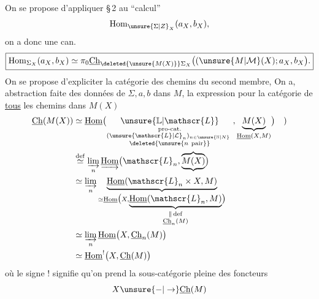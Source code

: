 On se propose d'appliquer    \S\,2
au ``calcul'' 
\[
\operatorname{Hom}_{\unsure{\Sigma|Z}_X}(a_X,b_X),
\]
on a donc une  can.
\[
\boxed{\operatorname{Hom}_{\Sigma_X}(a_X,b_X)\simeq\pi_0\underline{\mathrm{Ch}}_{\deleted{\unsure{M(X)}}\Sigma_X}\bigl((\unsure{M|\mathcal{M}}(X);a_X,b_X\bigr).}
\]
On se propose d'expliciter la catégorie des
chemins du second membre, On a, abstraction
faite des données de $\Sigma,a,b$ dans $M$, la
expression pour la catégorie de \uline{tous} les
chemins dans $M(X)$
\[
\begin{aligned}
\underline{\mathrm{Ch}}(M(X))
&\simeq\underline{\mathrm{Hom}}\bigl(
\underset{\substack{\text{pro-cat.}\\(\unsure{\mathscr{L}|\mathcal{L}}_n)_{n\in\unsure{\mathbb{N}|N}}\ \\ \deleted{\unsure{n\ \mathrm{pair}}}}}{\unsure{\mathbb{L}|\mathscr{L}}},
\underbrace{M(X)}_{\underline{\mathrm{Hom}}(X,M)}\bigr)\quad )\\
&\overset{\mathrm{def}}{\simeq}\varinjlim_n
\underrightarrow{\underline{\mathrm{Hom}}}\bigl(\mathscr{L}_n,\underbrace{\overbrace{M(X)}}\bigr)\\
&\simeq\varinjlim_n\underbrace{\underline{\mathrm{Hom}}(\mathscr{L}_n\times X,M)}_{
\simeq\underline{\mathrm{Hom}}\bigl(X,
\underbrace{\underline{\mathrm{Hom}}(\mathscr{L}_n,M)}_{\substack{\Vert\,\mathrm{def}\\\underline{\mathrm{Ch}}_n(M)}}\bigr)}\\
&\simeq\varinjlim_n\underline{\mathrm{Hom}}\bigl(X,\underline{\mathrm{Ch}}_n(M)\bigr)\\
&\simeq\underline{\mathrm{Hom}}^!\bigl(X,\underline{\mathrm{Ch}}(M)\bigr)
\end{aligned}
\]
où le signe $!$ signifie qu'on prend la sous-catégorie pleine des foncteurs 
\[
X\unsure{\mathord{-}|\to}\underline{\mathrm{Ch}}(M)
\]
